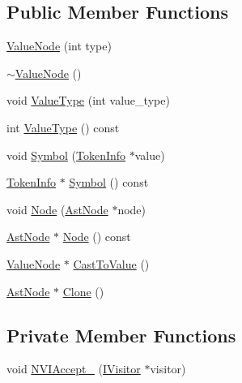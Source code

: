 \subsection*{Public Member Functions}
\begin{DoxyCompactItemize}
\item 
\hyperlink{classmocha_1_1_value_node_a9292c6ef0016c4e7b50c7e4e0277d0d6}{ValueNode} (int type)
\item 
\hyperlink{classmocha_1_1_value_node_a5be5facccbe2dca97bb12c8a1e224bac}{$\sim$ValueNode} ()
\item 
void \hyperlink{classmocha_1_1_value_node_ae400f4a35352d1052dffc60290c290a0}{ValueType} (int value\_\-type)
\item 
int \hyperlink{classmocha_1_1_value_node_a1648a5a81274965de10adc0de6d5442a}{ValueType} () const 
\item 
void \hyperlink{classmocha_1_1_value_node_a769c0c221283cca863964f6cf673c170}{Symbol} (\hyperlink{classmocha_1_1_token_info}{TokenInfo} $\ast$value)
\item 
\hyperlink{classmocha_1_1_token_info}{TokenInfo} $\ast$ \hyperlink{classmocha_1_1_value_node_a556983f5455ddc71d9cc885ba71ab8b3}{Symbol} () const 
\item 
void \hyperlink{classmocha_1_1_value_node_a88025ff701eebee191dc5783a2c161c7}{Node} (\hyperlink{classmocha_1_1_ast_node}{AstNode} $\ast$node)
\item 
\hyperlink{classmocha_1_1_ast_node}{AstNode} $\ast$ \hyperlink{classmocha_1_1_value_node_aa19fbbfa7bfa14ac10bcf0b5099abaa3}{Node} () const 
\item 
\hyperlink{classmocha_1_1_value_node}{ValueNode} $\ast$ \hyperlink{classmocha_1_1_value_node_ab847adefb50c26b29d2366f2113d02e2}{CastToValue} ()
\item 
\hyperlink{classmocha_1_1_ast_node}{AstNode} $\ast$ \hyperlink{classmocha_1_1_value_node_a960b13fc3b0e5544518b64a393f4c272}{Clone} ()
\end{DoxyCompactItemize}
\subsection*{Private Member Functions}
\begin{DoxyCompactItemize}
\item 
void \hyperlink{classmocha_1_1_value_node_adc856fc8531699b7c810736b677b2a0f}{NVIAccept\_\-} (\hyperlink{classmocha_1_1_i_visitor}{IVisitor} $\ast$visitor)
\end{DoxyCompactItemize}
